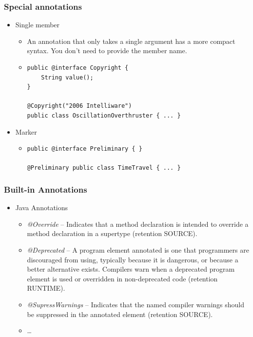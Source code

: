 \documentclass[10pt,xcolor=pdflatex]{beamer}
\begin{document}
\begin{frame}[containsverbatim]\frametitle{Special annotations}
\begin{itemize}
	\item Single member
      \begin{itemize}
    	\item An annotation that only takes a single argument has a more compact syntax. You don't need to provide the member name.
        	\item[] \begin{footnotesize} \begin{verbatim}
public @interface Copyright {
    String value();
}

@Copyright("2006 Intelliware")
public class OscillationOverthruster { ... }
\end{verbatim} \end{footnotesize}
      \end{itemize}
    \item Marker
   	  \begin{itemize}
    	\item[] \begin{footnotesize} \begin{verbatim}
public @interface Preliminary { }

@Preliminary public class TimeTravel { ... }
\end{verbatim} \end{footnotesize}
      \end{itemize}
\end{itemize}
\end{frame}

\begin{frame}\frametitle{Built-in Annotations}
\begin{itemize}
	\item Java Annotations
      \begin{itemize}
        \item \emph{@Override} -- Indicates that a method declaration is intended to override a method declaration in a supertype (retention SOURCE). 
	    \item \emph{@Deprecated} -- A program element annotated is one that programmers are discouraged from using, typically because it is dangerous, or because a better alternative exists. Compilers warn when a deprecated program element is used or overridden in non-deprecated code (retention RUNTIME).
	    \item \emph{@SupressWarnings} -- Indicates that the named compiler warnings should be suppressed in the annotated element (retention SOURCE).
        \item \ldots
      \end{itemize}
\end{itemize}
\end{frame}
\end{document}
